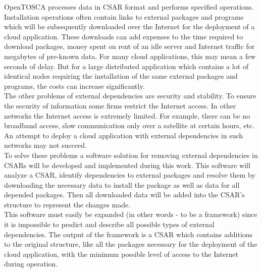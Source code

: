 OpenTOSCA processes data in CSAR format and performs specified operations. %
Installation operations often contain links to external packages and programs which will be subsequently downloaded over the Internet for the deployment of a cloud application.
These downloads can add expenses to the time required to download packages, money spent on rent of an idle server and Internet traffic for megabytes of pre-known data.
For many cloud applications, this may mean a few seconds of delay. 
But for a large distributed application which contains a lot of identical nodes requiring the installation of the same external packages and programs, the costs can increase significantly.\\
The other problems of external dependencies are security and stability.
To ensure the security of information some firms restrict the Internet access.
In other networks the Internet access is extremely limited.
For example, there can be no broadband access, slow communication only over a satellite at certain hours, etc.
An attempt to deploy a cloud application with external dependencies in such networks may not succeed. \\
To solve these problems a software solution for removing external dependencies in CSARs will be developed and implemented during this work.
This software will analyze a CSAR, identify dependencies to external packages and resolve them by downloading the necessary data to install the package as well as data for all depended packages. 
Then all downloaded data will be added into the CSAR's structure to represent the changes made.
\\
This software must easily be expanded (in other words - to be a framework) since it is impossible to predict and describe all possible types of external dependencies.
The output of the framework is a CSAR which contains additions to the original structure, like all the packages necessary for the deployment of the cloud application, with the minimum possible level of access to the Internet during operation.
\clearpage 
